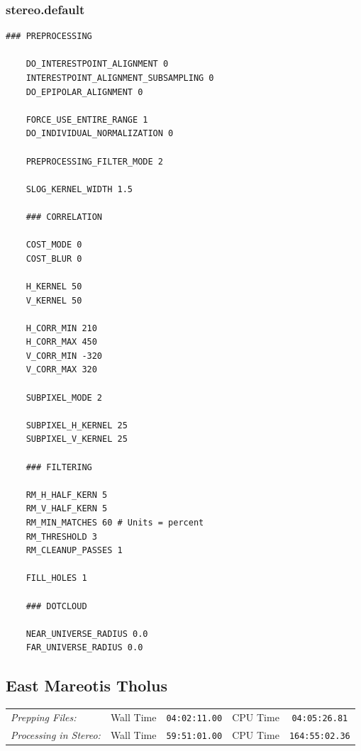\clearpage

\subsubsection*{stereo.default}

\begin{center}\begin{minipage}{5.5in}
\begin{Verbatim}[frame=single,fontsize=\small,label=stereo.default for HiRISE Columbia Hills]
    ### PREPROCESSING

    DO_INTERESTPOINT_ALIGNMENT 0
    INTERESTPOINT_ALIGNMENT_SUBSAMPLING 0
    DO_EPIPOLAR_ALIGNMENT 0

    FORCE_USE_ENTIRE_RANGE 1
    DO_INDIVIDUAL_NORMALIZATION 0

    PREPROCESSING_FILTER_MODE 2

    SLOG_KERNEL_WIDTH 1.5

    ### CORRELATION

    COST_MODE 0
    COST_BLUR 0

    H_KERNEL 50
    V_KERNEL 50

    H_CORR_MIN 210
    H_CORR_MAX 450
    V_CORR_MIN -320
    V_CORR_MAX 320

    SUBPIXEL_MODE 2

    SUBPIXEL_H_KERNEL 25
    SUBPIXEL_V_KERNEL 25

    ### FILTERING

    RM_H_HALF_KERN 5
    RM_V_HALF_KERN 5
    RM_MIN_MATCHES 60 # Units = percent
    RM_THRESHOLD 3
    RM_CLEANUP_PASSES 1

    FILL_HOLES 1

    ### DOTCLOUD

    NEAR_UNIVERSE_RADIUS 0.0
    FAR_UNIVERSE_RADIUS 0.0
\end{Verbatim}
\end{minipage}\end{center}

\clearpage
\subsection{East Mareotis Tholus}

\begin{tabular}{l r c r c}
\textit{Prepping Files:}       & Wall Time & \texttt{04:02:11.00} & CPU Time & \texttt{04:05:26.81} \\
\textit{Processing in Stereo:} & Wall Time & \texttt{59:51:01.00} & CPU Time & \texttt{164:55:02.36} \\
\end{tabular}

